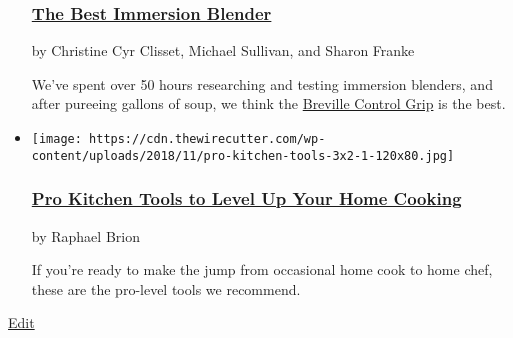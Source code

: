 \begin{itemize}
  \hypertarget{the-best-immersion-blender}{%
  \subsubsection{\texorpdfstring{\href{https://www.nytimes3xbfgragh.onion/wirecutter/reviews/best-immersion-blender/}{The
  Best Immersion
  Blender}}{The Best Immersion Blender}}\label{the-best-immersion-blender}}

  by Christine Cyr Clisset, Michael Sullivan, and Sharon Franke

  We've spent over 50 hours researching and testing immersion blenders,
  and after pureeing gallons of soup, we think the
  \href{https://www.nytimes3xbfgragh.onion/wirecutter/out/link/7616/0/4/79148/}{Breville
  Control Grip} is the best.
\item
  \href{https://www.nytimes3xbfgragh.onion/wirecutter/lists/pro-kitchen-tools-to-level-up-your-home-cooking/}{}

  \texttt{[image: https://cdn.thewirecutter.com/wp-content/uploads/2018/11/pro-kitchen-tools-3x2-1-120x80.jpg]}

  \hypertarget{pro-kitchen-tools-to-level-up-your-home-cooking}{%
  \subsubsection{\texorpdfstring{\href{https://www.nytimes3xbfgragh.onion/wirecutter/lists/pro-kitchen-tools-to-level-up-your-home-cooking/}{Pro
  Kitchen Tools to Level Up Your Home
  Cooking}}{Pro Kitchen Tools to Level Up Your Home Cooking}}\label{pro-kitchen-tools-to-level-up-your-home-cooking}}

  by Raphael Brion

  If you're ready to make the jump from occasional home cook to home
  chef, these are the pro-level tools we recommend.
\end{itemize}

\href{https://thewirecutter.com/wp-admin/post.php?post=10824\&action=edit}{Edit}


